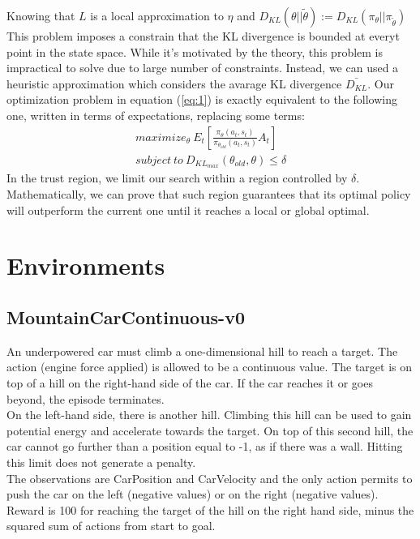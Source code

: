 \documentclass[11pt]{article}
\begin{document}
Knowing that $L$ is a local approximation to $\eta$ and
$D_{KL}(\theta|| \tilde{\theta}) := D_{KL}(\pi_{\theta}||\pi_{\tilde{\theta}})$ 
This problem imposes a constrain that the KL divergence is bounded at everyt point in the state
space. While it's motivated by the theory, this problem is impractical to solve due to large number
of constraints. Instead, we can used a heuristic approximation which considers the avarage KL
divergence $\bar{D_{KL}}$.
Our optimization problem in equation (\ref{eq:1}) is exactly equivalent to the following one, written
in terms of expectations, replacing some terms:
\begin{equation} 
        \begin{split}
        maximize_{\theta} \ E_t[\frac{\pi_{\theta}(a_t, s_t)}{\pi_{\theta_{old}}(a_t, s_t)}A_t]
        \\ \label{eq:2}
        subject \  to \ D_{KL_{max}}(\theta_{old}, \theta) \leq \delta
        \end{split}
\end{equation}
In the trust region, we limit our search within a region controlled by $\delta$. Mathematically, we
can prove that such region guarantees that its optimal policy will outperform the
current one until it reaches a local or global optimal.


\section{Environments}

\subsection{MountainCarContinuous-v0}
An underpowered car must climb a one-dimensional hill to reach a target. The
action (engine force applied) is allowed to be a continuous value.
The target is on top of a hill on the right-hand side of the car. If the car reaches it or goes beyond, the episode terminates.
\\
On the left-hand side, there is another hill. Climbing this hill can be used to
gain potential energy and accelerate towards the target. On top of this second
hill, the car cannot go further than a position equal to -1, as if there was a
wall. Hitting this limit does not generate a penalty.
\\
The observations are CarPosition and CarVelocity and the only action permits to
push the car on the left (negative values) or on the right (negative values).
\\
Reward is 100 for reaching the target of the hill on the right hand side, 
minus the squared sum of actions from start to goal.
\end{document}
